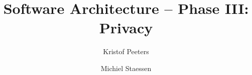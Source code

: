 \documentclass[11pt,a4paper,oneside]{book}
\begin{document}
\frontmatter



\title{Software Architecture -- Phase III: Privacy}
\author{Kristof Peeters \and Michiel Staessen}

\tableofcontents

%
%

\mainmatter




\appendix

\newpage

\nocite{*}
\end{document}
